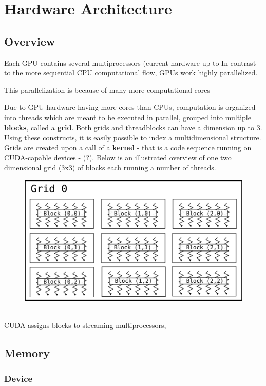 \section{Hardware Architecture}
\label{sec:hardware}
\subsection{Overview}
Each GPU contains several multiprocessors (current hardware up to 
In contrast to the more sequential CPU computational flow, GPUs work highly parallelized.

This parallelization is because of many more computational cores 

Due to GPU hardware having more cores than CPUs, computation is organized into threads which are meant to be executed in parallel, grouped into multiple \textbf{blocks}, called a \textbf{grid}. Both grids and threadblocks can have a dimension up to 3. Using these constructs, it is easily possible to index a multidimensional structure.\\
Grids are created upon a call of a \textbf{kernel} - that is a code sequence running on CUDA-capable devices - (?). Below is an illustrated overview of one two dimensional grid (3x3) of blocks each running a number of threads.\\
\begin{figure}
    \centering
    \includegraphics[scale=0.5]{media/threads_blocks_grid.png}
\end{figure}
\\
CUDA assigns blocks to streaming multiprocessors, 
\subsection{Memory}
\subsubsection{Device}
